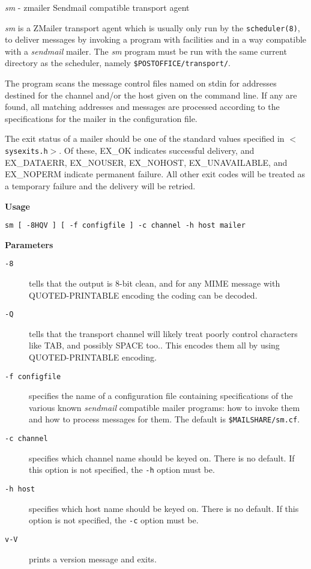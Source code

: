 {\em sm} - zmailer Sendmail compatible transport agent

{\em sm} is a ZMailer transport agent which is usually only run
by the {\tt scheduler(8)}, to deliver messages by invoking a
program with facilities and in a way compatible with a
{\em sendmail} mailer. The {\em sm} program must be run with the same
current directory as the scheduler, namely 
{\tt \$POSTOFFICE/transport/}.

The program scans the message control files named on stdin
for addresses destined for the channel and/or the host
given on the command line. If any are found, all matching
addresses and messages are processed according to the
specifications for the mailer in the configuration file.

The exit status of a mailer should be one of the standard
values specified in {\tt {\(<\)}sysexits.h{\(>\)}}. Of these, EX\_OK indicates 
successful delivery, and EX\_DATAERR, EX\_NOUSER,
EX\_NOHOST, EX\_UNAVAILABLE, and EX\_NOPERM indicate permanent 
failure. All other exit codes will be treated as a
temporary failure and the delivery will be retried.

{\bf Usage}

\begin{verbatim}
sm [ -8HQV ] [ -f configfile ] -c channel -h host mailer
\end{verbatim}

{\bf Parameters}

\begin{description}
\item[{\tt -8}] \mbox{}

tells that the output is 8-bit clean, and for any
MIME message with QUOTED-PRINTABLE encoding the
coding can be decoded.

\item[{\tt -Q}] \mbox{}

tells that the transport channel will likely treat
poorly control characters like TAB, and possibly
SPACE too.. This encodes them all by using QUOTED-PRINTABLE encoding.

\item[{\tt -f configfile}] \mbox{}

specifies the name of a configuration file containing 
specifications of the various known {\em sendmail}
compatible mailer programs: how to invoke them and
how to process messages for them. The default is {\tt \$MAILSHARE/sm.cf}.

\item[{\tt -c channel}] \mbox{}

specifies which channel name should be keyed on.
There is no default. If this option is not specified,
the {\tt -h} option must be.

\item[{\tt -h host}] \mbox{}

specifies which host name should be keyed on.
There is no default. If this option is not specified, the {\tt -c} option must be.

\item[{\tt v-V}] \mbox{}

prints a version message and exits.

\end{description}


